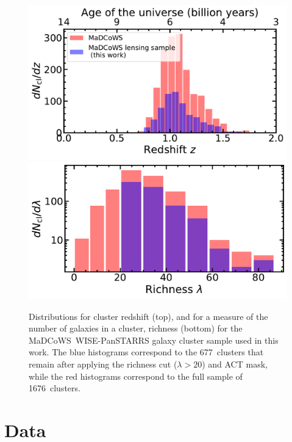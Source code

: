 \documentclass[preprint2]{aastex63}
\newcommand{\nclusters}{677~}
\newcommand{\tnclusters}{1676~}
\newcommand{\madcows}{MaDCoWS}
\begin{document}
\begin{figure}[t]
    \centering
\includegraphics[width=0.9\linewidth]{zhist.pdf}
    \includegraphics[width=0.9\linewidth]{lamhist.pdf}
    \caption{Distributions for cluster redshift (top), and for a measure of the number of galaxies in a cluster, richness (bottom) for the \madcows\ WISE-PanSTARRS galaxy cluster sample used in this work. The blue histograms correspond to the \nclusters clusters that remain after applying the richness cut ($\lambda>20$) and ACT mask, while the red histograms correspond to the full sample of \tnclusters clusters.}
    \label{fig:nz}
\end{figure}


\section{Data}
\end{document}
